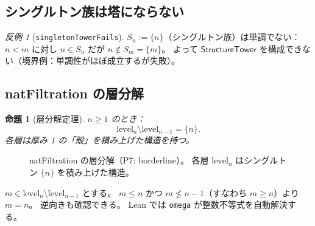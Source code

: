 \documentclass[a4paper,11pt]{ltjsarticle}
\theoremstyle{definition}
\theoremstyle{plain}
\newtheorem{proposition}[definition]{命題}
\theoremstyle{remark}
\newtheorem{counterexample}[definition]{反例}
\newcommand{\lev}{\mathrm{level}}
\begin{document}
\subsection{シングルトン族は塔にならない}

\begin{counterexample}[\texttt{singletonTowerFails}]
$S_n := \{n\}$（シングルトン族）は単調でない：
$n < m$ に対し $n \in S_n$ だが $n \notin S_m = \{m\}$。
よって $\mathsf{StructureTower}$ を構成できない（境界例：単調性がほぼ成立するが失敗）。
\end{counterexample}

\subsection{natFiltration の層分解}

\begin{proposition}[層分解定理]\label{prop:layer}
$n \geq 1$ のとき：
\[
  \lev_n \setminus \lev_{n-1} = \{n\}.
\]
各層は厚み 1 の「殻」を積み上げた構造を持つ。
\end{proposition}

\begin{figure}[H]
\centering
{}
\caption{natFiltration の層分解（P7: borderline）。
  各層 $\lev_n$ はシングルトン $\{n\}$ を積み上げた構造。}
\label{fig:layer}
\end{figure}

\begin{proofstrategy}
$m \in \lev_n \setminus \lev_{n-1}$ とする。
$m \leq n$ かつ $m \not\leq n-1$（すなわち $m \geq n$）より $m = n$。
逆向きも確認できる。
Lean では \texttt{omega} が整数不等式を自動解決する。
\end{proofstrategy}

\end{document}
